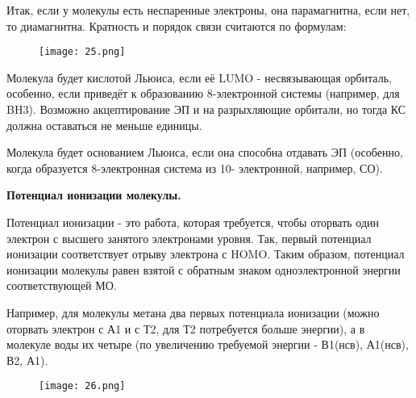 \par\smallskip	


Итак, если у молекулы есть неспаренные электроны, она
парамагнитна, если нет, то диамагнитна. Кратность и порядок связи
считаются по формулам:

\begin{figure}[H]
	\centering
	{\texttt{[image: 25.png]}}
\end{figure}

Молекула будет кислотой Льюиса, если её LUMO - несвязывающая
орбиталь, особенно, если приведёт к образованию 8-электронной
системы (например, для BH3). Возможно акцептирование ЭП и на
разрыхляющие орбитали, но тогда КС должна оставаться не меньше
единицы.

\par\smallskip	

Молекула будет основанием Льюиса, если она способна отдавать
ЭП (особенно, когда образуется 8-электронная система из 10-
электронной, например, СО).

	

\begin{center}
\textbf{Потенциал ионизации молекулы.}
\end{center}


Потенциал ионизации - это работа, которая требуется, чтобы
оторвать один электрон с высшего занятого электронами уровня.
Так, первый потенциал ионизации соответствует отрыву электрона
с HOMO. Таким образом, потенциал ионизации молекулы равен
взятой с обратным знаком одноэлектронной энергии
соответствующей МО.

\par\smallskip	

Например, для молекулы метана два первых потенциала
ионизации (можно оторвать электрон с А1 и с Т2, для Т2
потребуется больше энергии), а в молекуле воды их четыре (по
увеличению требуемой энергии - В1(нсв), А1(нсв), В2, А1).
	
	
\begin{figure}[H]
	\centering
	{\texttt{[image: 26.png]}}
\end{figure}	
	
	
\par\bigskip
\par\bigskip
